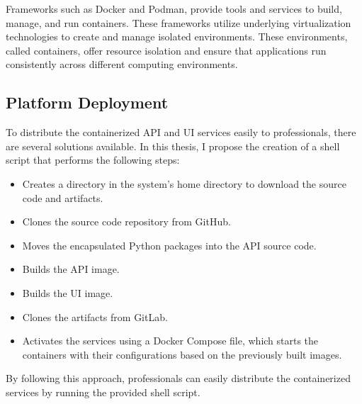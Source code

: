 Frameworks such as Docker and Podman, provide tools and services to build, manage, and run containers. These frameworks utilize underlying virtualization technologies to create and manage isolated environments. These environments, called containers, offer resource isolation and ensure that applications run consistently across different computing environments.

\subsection{Platform Deployment}

To distribute the containerized API and UI services easily to professionals, there are several solutions available. In this thesis, I propose the creation of a shell script that performs the following steps:

\begin{itemize}
  \item Creates a directory in the system's home directory to download the source code and artifacts.
  \item Clones the source code repository from GitHub.
  \item Moves the encapsulated Python packages into the API source code.
  \item Builds the API image.
  \item Builds the UI image.
  \item Clones the artifacts from GitLab.
  \item Activates the services using a Docker Compose file, which starts the containers with their configurations based on the previously built images.
\end{itemize}

By following this approach, professionals can easily distribute the containerized services by running the provided shell script.
